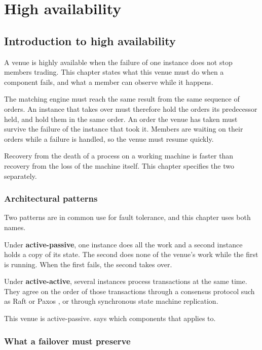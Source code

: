 \chapter{High availability}
\label{ch:high_availability}

\section{Introduction to high availability}
\label{sec:ha_intro}

A venue is highly available when the failure of one instance does not stop
members trading. This chapter states what this venue must do when a component
fails, and what a member can observe while it happens.

The matching engine must reach the same result from the same sequence of orders.
An instance that takes over must therefore hold the orders its predecessor held,
and hold them in the same order. An order the venue has taken must survive the
failure of the instance that took it. Members are waiting on their orders while
a failure is handled, so the venue must resume quickly.

Recovery from the death of a process on a working machine is faster than
recovery from the loss of the machine itself. This chapter specifies the two
separately.

\subsection{Architectural patterns}
\label{subsec:ha_architectural_patterns}

Two patterns are in common use for fault tolerance, and this chapter uses both
names.

Under \textbf{active-passive}, one instance does all the work and a second
instance holds a copy of its state. The second does none of the venue's work
while the first is running. When the first fails, the second takes over.

Under \textbf{active-active}, several instances process transactions at the same
time. They agree on the order of those transactions through a consensus protocol
such as Raft or Paxos \cite{ongaro2014raft,lamport2001paxos}, or through
synchronous state machine replication.

This venue is active-passive.  says which components
that applies to.

\subsection{What a failover must preserve}
\label{subsec:ha_failover_mechanics}

